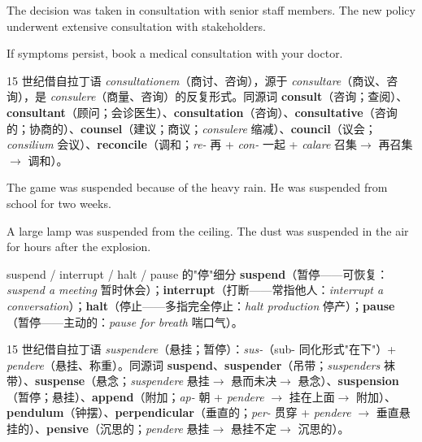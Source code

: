 \documentclass[../main.tex]{subfiles}
\begin{document}

{The decision was taken in consultation with senior staff members.}
{The new policy underwent extensive consultation with stakeholders.}

{If symptoms persist, book a medical consultation with your doctor.}

\begin{origin}
15 世纪借自拉丁语 \textit{consultationem}（商讨、咨询），源于 \textit{consultare}（商议、咨询），是 \textit{consulere}（商量、咨询）的反复形式。同源词 \textbf{consult}（咨询；查阅）、\textbf{consultant}（顾问；会诊医生）、\textbf{consultation}（咨询）、\textbf{consultative}（咨询的；协商的）、\textbf{counsel}（建议；商议；\textit{consulere} 缩减）、\textbf{council}（议会；\textit{consilium} 会议）、\textbf{reconcile}（调和；\textit{re-} 再 + \textit{con-} 一起 + \textit{calare} 召集$\to$ 再召集$\to$ 调和）。
\end{origin}


{The game was suspended because of the heavy rain.}
{He was suspended from school for two weeks.}

{A large lamp was suspended from the ceiling.}
{The dust was suspended in the air for hours after the explosion.}

\begin{gram}{suspend / interrupt / halt / pause 的"停"细分}
\textbf{suspend}（暂停——可恢复：\textit{suspend a meeting} 暂时休会）；\textbf{interrupt}（打断——常指他人：\textit{interrupt a conversation}）；\textbf{halt}（停止——多指完全停止：\textit{halt production} 停产）；\textbf{pause}（暂停——主动的：\textit{pause for breath} 喘口气）。
\end{gram}

\begin{origin}
15 世纪借自拉丁语 \textit{suspendere}（悬挂；暂停）：\textit{sus-}（sub- 同化形式"在下"）+ \textit{pendere}（悬挂、称重）。同源词 \textbf{suspend}、\textbf{suspender}（吊带；\textit{suspenders} 袜带）、\textbf{suspense}（悬念；\textit{suspendere} 悬挂$\to$ 悬而未决$\to$ 悬念）、\textbf{suspension}（暂停；悬挂）、\textbf{append}（附加；\textit{ap-} 朝 + \textit{pendere} $\to$ 挂在上面$\to$ 附加）、\textbf{pendulum}（钟摆）、\textbf{perpendicular}（垂直的；\textit{per-} 贯穿 + \textit{pendere} $\to$ 垂直悬挂的）、\textbf{pensive}（沉思的；\textit{pendere} 悬挂$\to$ 悬挂不定$\to$ 沉思的）。
\end{origin}
\end{document}

